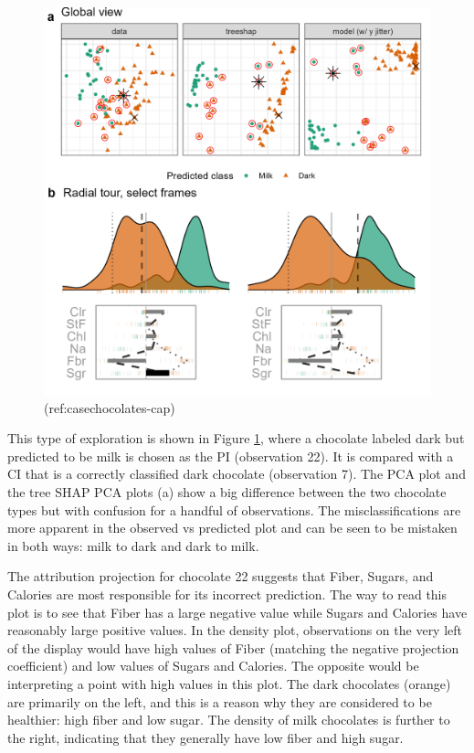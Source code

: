 \documentclass[
]{jss}
\begin{document}
\begin{CodeChunk}
\begin{figure}

{\centering \includegraphics[width=1\linewidth]{./figures/case_chocolates} 

}

\caption[(ref:casechocolates-cap)]{(ref:casechocolates-cap)}\label{fig:casechocolates}
\end{figure}
\end{CodeChunk}

This type of exploration is shown in Figure \ref{fig:casechocolates},
where a chocolate labeled dark but predicted to be milk is chosen as the
PI (observation 22). It is compared with a CI that is a correctly
classified dark chocolate (observation 7). The PCA plot and the tree
SHAP PCA plots (a) show a big difference between the two chocolate types
but with confusion for a handful of observations. The misclassifications
are more apparent in the observed vs predicted plot and can be seen to
be mistaken in both ways: milk to dark and dark to milk.

The attribution projection for chocolate 22 suggests that Fiber, Sugars,
and Calories are most responsible for its incorrect prediction. The way
to read this plot is to see that Fiber has a large negative value while
Sugars and Calories have reasonably large positive values. In the
density plot, observations on the very left of the display would have
high values of Fiber (matching the negative projection coefficient) and
low values of Sugars and Calories. The opposite would be interpreting a
point with high values in this plot. The dark chocolates (orange) are
primarily on the left, and this is a reason why they are considered to
be healthier: high fiber and low sugar. The density of milk chocolates
is further to the right, indicating that they generally have low fiber
and high sugar.
\end{document}
